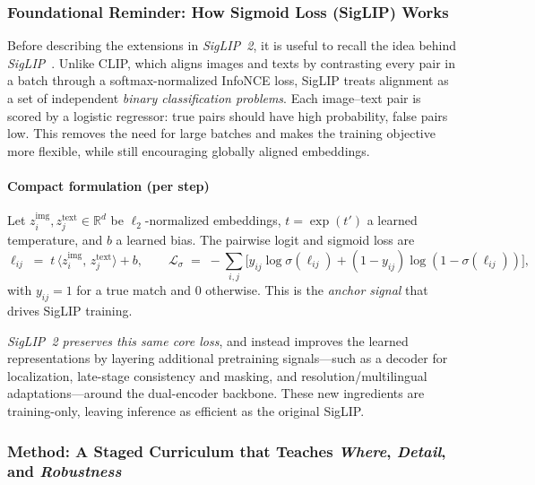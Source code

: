 \begin{enrichment}
\begin{enrichment}
        \newpage
        
        \subsubsection{Foundational Reminder: How Sigmoid Loss (SigLIP) Works}
        \label{subsubsec:siglip2_foundation}
        \noindent
        Before describing the extensions in \emph{SigLIP~2}, it is useful to recall the idea behind \emph{SigLIP}~\cite{zhai2023_siglip}. Unlike CLIP, which aligns images and texts by contrasting every pair in a batch through a softmax-normalized InfoNCE loss, SigLIP treats alignment as a set of independent \emph{binary classification problems}. Each image--text pair is scored by a logistic regressor: true pairs should have high probability, false pairs low. This removes the need for large batches and makes the training objective more flexible, while still encouraging globally aligned embeddings.
        
        \paragraph{Compact formulation (per step)}
        Let $z^{\text{img}}_i, z^{\text{text}}_j \in \mathbb{R}^d$ be $\ell_2$-normalized embeddings, $t=\exp(t')$ a learned temperature, and $b$ a learned bias. The pairwise logit and sigmoid loss are
        \[
        \ell_{ij} \;=\; t \,\big\langle z^{\text{img}}_i,\, z^{\text{text}}_j \big\rangle + b,
        \qquad
        \mathcal{L}_{\sigma} \;=\; - \sum_{i,j}\!\big[y_{ij}\log\sigma(\ell_{ij}) + (1-y_{ij})\log(1-\sigma(\ell_{ij}))\big],
        \]
        with $y_{ij}=1$ for a true match and $0$ otherwise. This is the \emph{anchor signal} that drives SigLIP training. 
        
        \noindent
        \emph{SigLIP~2 preserves this same core loss}, and instead improves the learned representations by layering additional pretraining signals—such as a decoder for localization, late-stage consistency and masking, and resolution/multilingual adaptations—around the dual-encoder backbone. These new ingredients are training-only, leaving inference as efficient as the original SigLIP.
        
        \newpage
        
        \subsubsection{Method: A Staged Curriculum that Teaches \emph{Where}, \emph{Detail}, and \emph{Robustness}}
        \label{subsubsec:siglip2_method}
        

\end{enrichment}
\end{enrichment}
